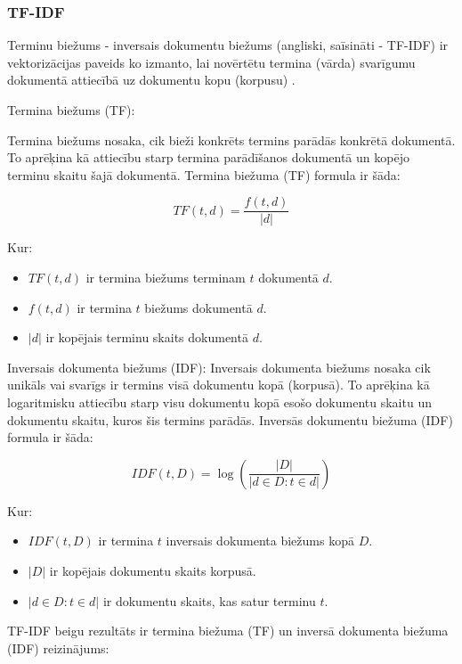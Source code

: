 \subsubsection{TF-IDF}
Terminu biežums - inversais dokumentu biežums (angliski, saīsināti - TF-IDF) ir vektorizācijas paveids ko izmanto, lai novērtētu termina (vārda) svarīgumu dokumentā attiecībā uz dokumentu kopu (korpusu) \cite{manning_raghavan_schutze_2008}. 

Termina biežums (TF):

Termina biežums nosaka, cik bieži konkrēts termins parādās konkrētā dokumentā. To aprēķina kā attiecību starp termina parādīšanos dokumentā un kopējo terminu skaitu šajā dokumentā. Termina biežuma (TF) formula ir šāda:

\begin{equation}
TF(t, d) = \frac{f(t, d)}{|d|}
\end{equation}

\noindent Kur:
\begin{itemize}
\item \(TF(t, d)\) ir termina biežums terminam \(t\) dokumentā \(d\).
\item \(f(t, d)\) ir termina \(t\) biežums dokumentā \(d\).
\item \(|d|\) ir kopējais terminu skaits dokumentā \(d\).
\end{itemize}

Inversais dokumenta biežums (IDF):
Inversais dokumenta biežums nosaka cik unikāls vai svarīgs ir termins visā dokumentu kopā (korpusā). To aprēķina kā logaritmisku attiecību starp visu dokumentu kopā esošo dokumentu skaitu un dokumentu skaitu, kuros šis termins parādās. Inversās dokumentu biežuma (IDF) formula ir šāda:

\begin{equation}
IDF(t, D) = \log\left(\frac{|D|}{|{d \in D : t \in d}|}\right)
\end{equation}

\noindent Kur:
\begin{itemize}
\item \(IDF(t, D)\) ir termina \(t\) inversais dokumenta biežums kopā \(D\).
\item \(|D|\) ir kopējais dokumentu skaits korpusā.
\item \(|{d \in D : t \in d}|\) ir dokumentu skaits, kas satur terminu \(t\).
\end{itemize}

TF-IDF beigu rezultāts ir termina biežuma (TF) un inversā dokumenta biežuma (IDF) reizinājums:

